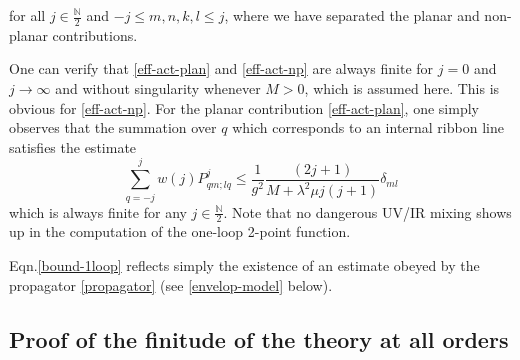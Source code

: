 \documentclass[a4paper,11pt,twoside]{article}
\numberwithin{equation}{section}
\theoremstyle{nonumberplain}
\newcounter{and}
\begin{document}
%
for all $j\in\frac{\mathbb{N}}{2}$ and $-j\le m,n,k,l\le j$, where we have separated the planar and non-planar contributions.\par%
%
One can verify that \eqref{eff-act-plan} and \eqref{eff-act-np} are always finite for $j=0$ and $j\to\infty$ and without singularity whenever $M>0$, which is assumed here. This is obvious for \eqref{eff-act-np}. For the planar contribution \eqref{eff-act-plan}, one simply observes that the summation over $q$ which corresponds to an internal ribbon line satisfies the estimate%
%
\begin{equation}
\sum_{q=-j}^j w(j) P^j_{qm;lq} \le \frac{1}{g^2} \frac{(2j+1)}{M+\lambda^2\mu j(j+1)} \delta_{ml} \label{bound-1loop}
\end{equation}
%
which is always finite for any $j\in\frac{\mathbb{N}}{2}$. Note that no dangerous UV/IR mixing shows up in the computation of the one-loop 2-point function.\par %
%
Eqn.\eqref{bound-1loop} reflects simply the existence of an estimate obeyed by the propagator \eqref{propagator} (see \eqref{envelop-model} below). 


\subsection{Proof of the finitude of the theory at all orders}\label{sec:proof_all_orders}
\end{document}
